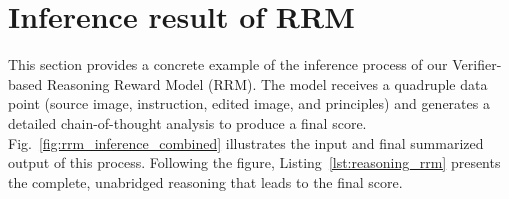 

\section{Inference result of RRM}
\label{append:rrm}
This section provides a concrete example of the inference process of our Verifier-based Reasoning Reward Model (RRM). The model receives a quadruple data point (source image, instruction, edited image, and principles) and generates a detailed chain-of-thought analysis to produce a final score. 
Fig.~\ref{fig:rrm_inference_combined} illustrates the input and final summarized output of this process. Following the figure, Listing~\ref{lst:reasoning_rrm} presents the complete, unabridged reasoning that leads to the final score.

